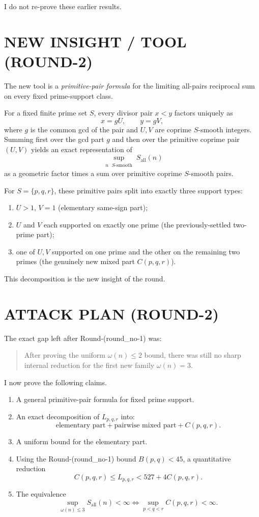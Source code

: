I do not re-prove these earlier results.

\section{NEW INSIGHT / TOOL (ROUND-2)}

The new tool is a \emph{primitive-pair formula} for the limiting all-pairs reciprocal sum on every fixed prime-support class.

For a fixed finite prime set \(S\), every divisor pair \(x<y\) factors uniquely as
\[
x=gU,\qquad y=gV,
\]
where \(g\) is the common gcd of the pair and \(U,V\) are coprime \(S\)-smooth integers. Summing first over the gcd part \(g\) and then over the primitive coprime pair \((U,V)\) yields an exact representation of
\[
\sup_{\substack{n\text{ }S\text{-smooth}}} S_{\mathrm{all}}(n)
\]
as a geometric factor times a sum over primitive coprime \(S\)-smooth pairs.

For \(S=\{p,q,r\}\), these primitive pairs split into exactly three support types:
\begin{enumerate}
\item \(U>1\), \(V=1\) (elementary same-sign part);
\item \(U\) and \(V\) each supported on exactly one prime (the previously-settled two-prime part);
\item one of \(U,V\) supported on one prime and the other on the remaining two primes (the genuinely new mixed part \(C(p,q,r)\)).
\end{enumerate}

This decomposition is the new insight of the round.

\section{ATTACK PLAN (ROUND-2)}

The exact gap left after Round-(round\_no-1) was:

\begin{quote}
After proving the uniform \(\omega(n)\le 2\) bound, there was still no sharp internal reduction for the first new family \(\omega(n)=3\).
\end{quote}

I now prove the following claims.

\begin{enumerate}
\item A general primitive-pair formula for fixed prime support.
\item An exact decomposition of \(L_{p,q,r}\) into:
\[
\text{elementary part}+\text{pairwise mixed part}+C(p,q,r).
\]
\item A uniform bound for the elementary part.
\item Using the Round-(round\_no-1) bound \(B(p,q)<45\), a quantitative reduction
\[
C(p,q,r)\le L_{p,q,r}<527+4C(p,q,r).
\]
\item The equivalence
\[
\sup_{\omega(n)\le 3}S_{\mathrm{all}}(n)<\infty
\iff
\sup_{p<q<r}C(p,q,r)<\infty.
\]
\end{enumerate}

